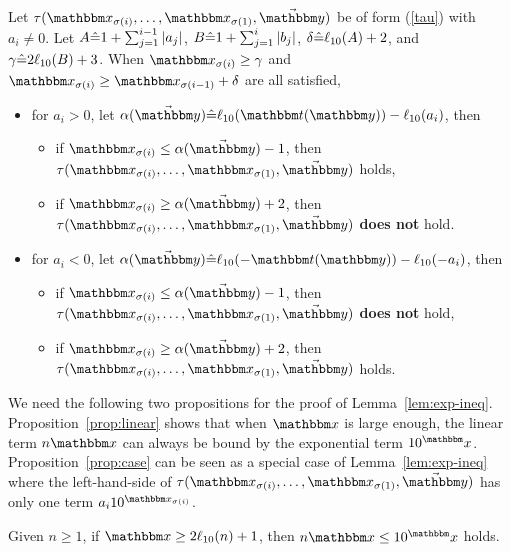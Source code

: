 \begin{lemma} \label{lem:exp-ineq}
Let $\tau(\ivarx_{\sigma(i)}, \ldots, \ivarx_{\sigma(1)}, \vec{\ivary})$ be of form (\ref{tau}) 
with $a_i \neq 0$. Let $A\hat{=} 1+\sum_{j=1}^{i-1}\vert a_j\vert$, 
$B \hat{=} 1+\sum_{j=1}^{i}\vert b_j\vert$, 
$\delta\hat{=}  \ell_{10}(A)+2$,
and $\gamma \hat{=} 2\ell_{10}(B)+3$. 
When $\ivarx_{\sigma(i)} \ge \gamma$ and  $\ivarx_{\sigma(i)} \ge \ivarx_{\sigma(i-1)} +\delta$ are all satisfied,
\begin{itemize}
    \item for $a_i > 0$, let $\alpha(\vec{\ivary}) \Def \ell_{10}(\iterm(\ivary))- \ell_{10}(a_i)$, then 
    \begin{itemize}
        \item if $\ivarx_{\sigma(i)} \le \alpha(\vec{\ivary})  -1$, then $\tau(\ivarx_{\sigma(i)}, \ldots, \ivarx_{\sigma(1)}, \vec{\ivary})$ holds,
        \item if $\ivarx_{\sigma(i)} \ge \alpha(\vec{\ivary})  +2$, then $\tau(\ivarx_{\sigma(i)}, \ldots, \ivarx_{\sigma(1)}, \vec{\ivary})$ \textbf{does not} hold.
    \end{itemize}
    \item for $a_i < 0$, let $\alpha(\vec{\ivary})  \Def \ell_{10}(-\iterm(\ivary))- \ell_{10}(-a_i)$, then 
    \begin{itemize}
        \item if $\ivarx_{\sigma(i)} \le \alpha(\vec{\ivary})  -1$, then $\tau(\ivarx_{\sigma(i)}, \ldots, \ivarx_{\sigma(1)}, \vec{\ivary})$ \textbf{does not} hold,
        \item if $\ivarx_{\sigma(i)} \ge \alpha(\vec{\ivary})  +2$, then $\tau(\ivarx_{\sigma(i)}, \ldots, \ivarx_{\sigma(1)}, \vec{\ivary})$ holds.
    \end{itemize}
\end{itemize}
\end{lemma}

We need the following two propositions for the proof of Lemma~\ref{lem:exp-ineq}. 
Proposition~\ref{prop:linear} shows that when $\ivarx$ is large enough, the linear term $n \ivarx$ can always be bound by the exponential term $10^\ivarx$. Proposition~\ref{prop:case} can be seen as a special case of Lemma~\ref{lem:exp-ineq} where the left-hand-side of $\tau(\ivarx_{\sigma(i)}, \ldots, \ivarx_{\sigma(1)}, \vec{\ivary})$ has only one term $a_i 10^{\ivarx_{\sigma(i)}}$. 

\vspace*{-3mm}

\begin{proposition} \label{prop:linear}
Given $n\ge 1$, if $\ivarx \ge 2\ell_{10}(n)+1$, then 
$n \ivarx  \le 10^\ivarx$ holds.
\end{proposition}

